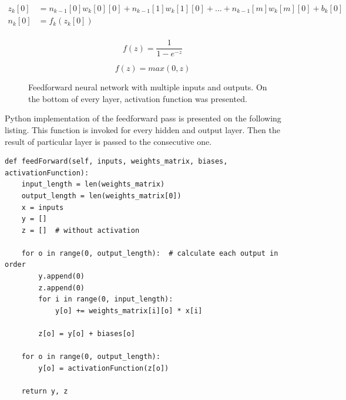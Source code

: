 \begin{equation} \label{eq:feedforward}
\begin{aligned}
    z_k[0]&=n_{k-1}[0]w_k[0][0]+n_{k-1}[1]w_k[1][0]+\dots+n_{k-1}[m]w_k[m][0] + b_k[0] \\
    n_k[0]&=f_k(z_k[0]) \\
\end{aligned}
\end{equation}

\begin{equation} \label{eq:sigmoid}
f(z)=\frac{1}{1-e^{-z}}
\end{equation}

\begin{equation} \label{eq:ReLU}
f(z)=max(0, z)
\end{equation}

\begin{figure}[H]
	\begin{center}
	\end{center}
	\caption{Feedforward neural network with multiple inputs and outputs. On the bottom of every layer, activation function was presented.}

	\label{fig:feedforward}
\end{figure}
Python implementation of the feedforward pass is presented on the following listing. This function is invoked for every hidden and output layer. Then the result of particular layer is passed to the consecutive one.
\begin{verbatim}
def feedForward(self, inputs, weights_matrix, biases, activationFunction):
    input_length = len(weights_matrix)
    output_length = len(weights_matrix[0])
    x = inputs
    y = []
    z = []  # without activation
    
    for o in range(0, output_length):  # calculate each output in order
        y.append(0)
        z.append(0)
        for i in range(0, input_length): 
            y[o] += weights_matrix[i][o] * x[i]
    
        z[o] = y[o] + biases[o]
    
    for o in range(0, output_length):
        y[o] = activationFunction(z[o])
    
    return y, z
\end{verbatim}
